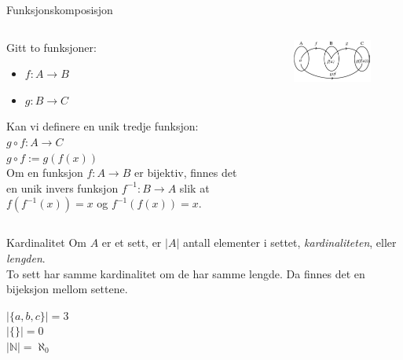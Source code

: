 \begin{frame}{Funksjonskomposisjon}
    \begin{columns}
    \begin{column}{0.5\textwidth}
Gitt to funksjoner:
    \begin{itemize}
        \item $f : A \rightarrow B$
        \item $g : B \rightarrow C$
    \end{itemize}
Kan vi definere en unik tredje funksjon: \\
    $g \circ f : A \rightarrow C$\\
    $g \circ f := g(f(x))$\\
Om en funksjon $f : A \rightarrow B$ er bijektiv, finnes det en unik invers funksjon $f^{-1} : B \rightarrow A$ slik at $f(f^{-1}(x)) = x$ og $f^{-1}(f(x)) = x$.
    \end{column}
    \begin{column}{0.33\textwidth}
    \begin{figure}
       \includegraphics[scale = 0.4]{gof.jpeg} 
    \end{figure}
        
    \end{column}
    \end{columns}
\end{frame}

\begin{frame}{Kardinalitet}
    Om $A$ er et sett, er $|A|$ antall elementer i settet, \textit{kardinaliteten}, eller \textit{lengden}.\\
    To sett har samme kardinalitet om de har samme lengde. Da finnes det en bijeksjon mellom settene.
    \begin{block}
        $|\{a, b, c\}| = 3$\\
        $|\{\}| = 0$\\
        $|\mathbb{N}| = \aleph_0$
    \end{block}
\end{frame}

